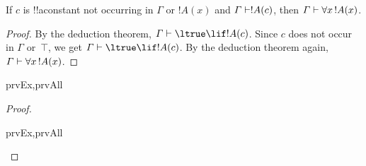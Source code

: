\documentclass[../../../include/open-logic-section]{subfiles}
\begin{document}


\begin{thm}
 If $c$ is !!a{constant} not occurring
in $\Gamma$ or $!A(x)$ and $\Gamma \Proves !A(c)$, then $\Gamma
\Proves \lforall[x][!A(x)]$.
\end{thm}

\begin{proof}
By the deduction theorem, $\Gamma \Proves \ltrue \lif !A(c)$. Since
$c$ does not occur in $\Gamma$ or~$\top$, we get $\Gamma \Proves
\ltrue \lif !A(c)$. By the deduction theorem again, $\Gamma \Proves
\lforall[x][!A(x)]$.
\end{proof}

\begin{prop}
\begin{tagenumerate}{prvEx,prvAll}

\end{tagenumerate}
\end{prop}

\begin{proof}
\begin{tagenumerate}{prvEx,prvAll}
\end{tagenumerate}
\end{proof}
\end{document}
